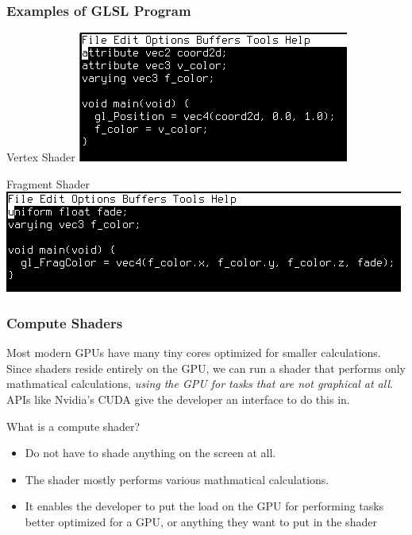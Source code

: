 \documentclass{beamer}
\begin{document}
\begin{frame}

  \frametitle{Examples of GLSL Program}
  \begin{block}{Vertex Shader}
    \includegraphics[scale=.4]{vert_shader.png}
  \end{block}
  \begin{block}{Fragment Shader}
    \includegraphics[scale=.4]{frag_shader.png}
  \end{block}
\end{frame}

\begin{frame}

  \frametitle{Compute Shaders}
Most modern GPUs have many tiny cores optimized for smaller calculations. Since shaders reside entirely on the GPU, we can run a shader that performs only mathmatical calculations, \emph{using the GPU for tasks that are not graphical at all}. APIs like Nvidia's CUDA give the developer an interface to do this in.
\begin{block}{What is a compute shader?}
  \begin{itemize}
\item Do not have to shade anything on the screen at all.
\item The shader mostly performs various mathmatical calculations.
\item It enables the developer to put the load on the GPU for performing tasks better optimized for a GPU, or anything they want to put in the shader
  \end{itemize}
\end{block}
\end{frame}
\end{document}
